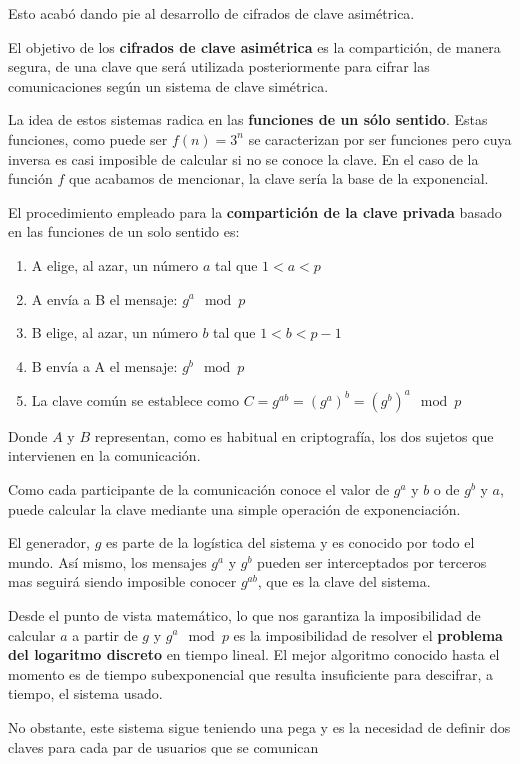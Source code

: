 \documentclass[nochap]{apuntesURJC}
\begin{document}
Esto acabó dando pie al desarrollo de cifrados de clave asimétrica.

El objetivo de los \textbf{cifrados de clave asimétrica} es la compartición, de manera segura, de una clave que será utilizada posteriormente para cifrar las comunicaciones según un sistema de clave simétrica.

La idea de estos sistemas radica en las \textbf{funciones de un sólo sentido}. Estas funciones, como puede ser $f(n)=3^n$ se caracterizan por ser funciones  pero cuya inversa es casi imposible de calcular si no se conoce la clave. En el caso de la función $f$ que acabamos de mencionar, la clave sería la base de la exponencial.

El procedimiento empleado para la \textbf{compartición de la clave privada} basado en las funciones de un solo sentido es:

\begin{enumerate}
\item A elige, al azar, un número $a$ tal que $1<a<p$
\item A envía a B el mensaje: $g^a \mod p$
\item B elige, al azar, un número $b$ tal que $1<b<p-1$
\item B envía a A el mensaje: $g^b \mod p$
\item La clave común se establece como $C=g^{ab}=(g^a)^b = (g^b)^a \mod p$
\end{enumerate}

Donde $A$ y $B$ representan, como es habitual en criptografía, los dos sujetos que intervienen en la comunicación.

Como cada participante de la comunicación conoce el valor de $g^a$ y $b$ o de $g^b$ y $a$, puede calcular la clave mediante una simple operación de exponenciación.

El generador, $g$ es parte de la logística del sistema y es conocido por todo el mundo. Así mismo, los mensajes $g^a$ y $g^b$ pueden ser interceptados por terceros mas seguirá siendo imposible conocer $g^{ab}$, que es la clave del sistema.

Desde el punto de vista matemático, lo que nos garantiza la imposibilidad de calcular $a$ a partir de $g$ y $g^a \mod p$ es la imposibilidad de resolver el \textbf{problema del logaritmo discreto} en tiempo lineal. El mejor algoritmo conocido hasta el momento es de tiempo subexponencial que resulta insuficiente para descifrar, a tiempo, el sistema usado.

No obstante, este sistema sigue teniendo una pega y es la necesidad de definir dos claves para cada par de usuarios que se comunican
\end{document}
